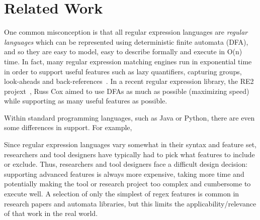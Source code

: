 \section{Related Work}
\label{sec:related}

%

 

One common misconception is that all regular expression languages are \emph{regular languages} which can be represented using deterministic finite automata (DFA), and so they are easy to model, easy to describe formally and execute in O(n) time.  In fact, many regular expression matching engines run in exponential time in order to support useful features such as lazy quantifiers, capturing groups, look-aheads and back-references~\cite{msdnmatching}.  In a recent regular expression library, the RE2 projext~\cite{re2}, Russ Cox aimed to use DFAs as much as possible (maximizing speed) while supporting as many useful features as possible.

Within standard programming languages, such as Java or Python, there are even some differences in support. For example, 

Since  regular expression languages vary somewhat in their syntax and feature set, researchers and tool designers have typically had to pick what features to include or exclude. Thus, researchers and tool designers face a difficult design decision: supporting advanced features is always more expensive, taking more time and potentially making the tool or research project too complex and cumbersome to execute well.  A selection of only the simplest of regex features is common in research papers and automata libraries, but this limits the applicability/relevance of that work in the real world.



